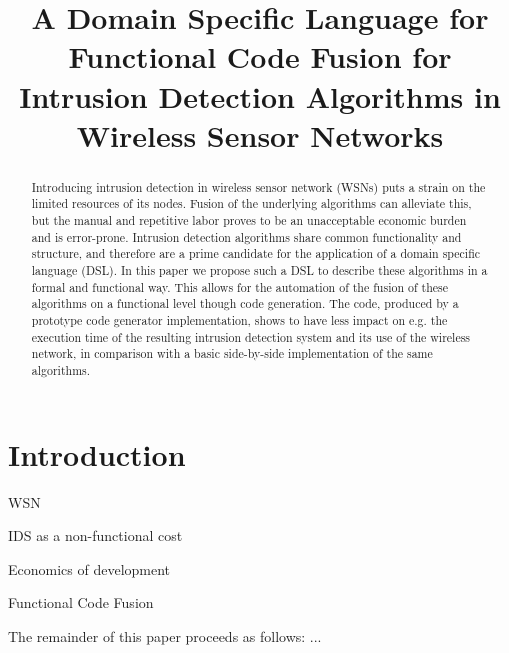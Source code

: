 \documentclass[conference]{IEEEtran}
\begin{document}
\expandafter\def\csname PY@tok@err\endcsname{}

\title{A Domain Specific Language for Functional Code Fusion for
       Intrusion Detection Algorithms in Wireless Sensor Networks}

\author{%
}

\maketitle

\begin{abstract}

Introducing intrusion detection in wireless sensor network (WSNs) puts a strain
on the limited resources of its nodes. Fusion of the underlying algorithms can
alleviate this, but the manual and repetitive labor proves to be an
unacceptable economic burden and is error-prone. Intrusion detection algorithms
share common functionality and structure, and therefore are a prime candidate
for the application of a domain specific language (DSL). In this paper we
propose such a DSL to describe these algorithms in a formal and functional way.
This allows for the automation of the fusion of these algorithms on a
functional level though code generation. The code, produced by a prototype code
generator implementation, shows to have less impact on e.g. the execution time
of the resulting intrusion detection system and its use of the wireless
network, in comparison with a basic side-by-side implementation of the same
algorithms.

\end{abstract}

\section{Introduction}

WSN

IDS as a non-functional cost

Economics of development

Functional Code Fusion

The remainder of this paper proceeds as follows: ...
\end{document}
